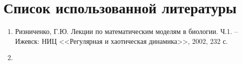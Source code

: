 \chapter{}
\chapter{}
\chapter{Список использованной литературы}
    \begin{enumerate}
        \item Ризниченко, Г.Ю. Лекции по математическим моделям в биологии. Ч.1. -- Ижевск: НИЦ
            <<Регулярная и хаотическая динамика>>, 2002, 232 с.
        \item
    \end{enumerate}
